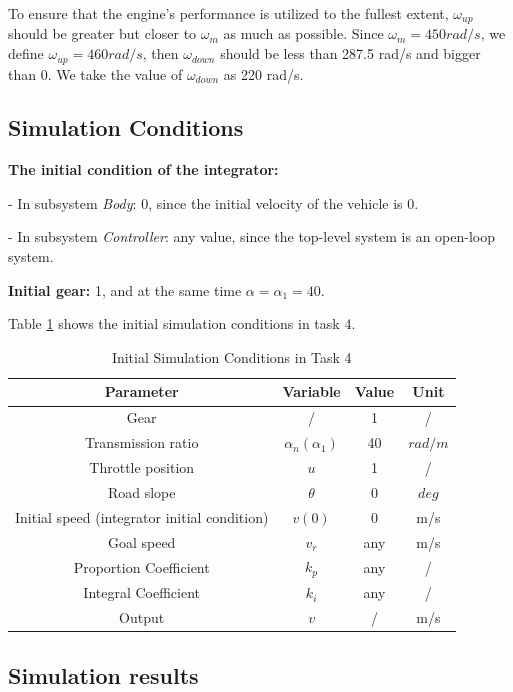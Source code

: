 \documentclass[12pt]{article}
\begin{document}
To ensure that the engine's performance is utilized to the fullest extent, $\omega_{up}$ should be greater but closer to $\omega_m$ as much as possible. Since $\omega_m = 450 rad/s$, we define $\omega_{up} = 460 rad/s$, then $\omega_{down}$ should be less than 287.5 rad/s and bigger than 0. We take the value of $\omega_{down}$ as 220 rad/s.

\subsection{Simulation Conditions}

\textbf{The initial condition of the integrator:}

- In subsystem \textit{Body}: 0, since the initial velocity of the vehicle is 0.

- In subsystem \textit{Controller}: any value, since the top-level system is an open-loop system.

\textbf{Initial gear:} 1, and at the same time $\alpha = \alpha_1 = 40$.

Table \ref{tab:task4_simcondition} shows the initial simulation conditions in task 4.

\begin{table}[htbp]
    \centering
    \begin{tabular}{cccc}
       \hline
       Parameter & Variable & Value & Unit \\
       \hline
       Gear & / & 1 & / \\
       Transmission ratio & $\alpha_n (\alpha_1)$ & 40 & $rad/m$\\
       Throttle position & $u$ & 1 & / \\
       Road slope & $\theta$ & 0 & $deg$ \\ 
       Initial speed (integrator initial condition) & $v(0)$ & 0 & m/s \\
       Goal speed & $v_r$ & any & m/s \\
       Proportion Coefficient & $k_p$ & any & / \\
       Integral Coefficient & $k_i$ & any & / \\
       Output & $v$ & / & m/s \\
    \hline
    \end{tabular}
    \caption{Initial Simulation Conditions in Task 4}
    \label{tab:task4_simcondition}
\end{table}

\subsection{Simulation results}
\end{document}
